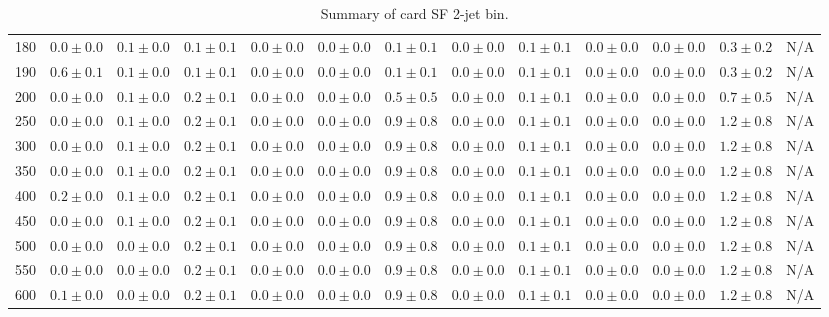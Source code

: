 \begin{table}
{\begin{center}
\begin{tabular}{l | c c | c c c c c c c c  | c c}
180 & $0.0\pm0.0$ & $0.1\pm0.0$ & $0.1\pm0.1$ & $0.0\pm0.0$ & $0.0\pm0.0$ & $0.1\pm0.1$ & $0.0\pm0.0$ & $0.1\pm0.1$ & $0.0\pm0.0$ & $0.0\pm0.0$ & $0.3\pm0.2$ &  N/A \\
190 & $0.6\pm0.1$ & $0.1\pm0.0$ & $0.1\pm0.1$ & $0.0\pm0.0$ & $0.0\pm0.0$ & $0.1\pm0.1$ & $0.0\pm0.0$ & $0.1\pm0.1$ & $0.0\pm0.0$ & $0.0\pm0.0$ & $0.3\pm0.2$ &  N/A \\
200 & $0.0\pm0.0$ & $0.1\pm0.0$ & $0.2\pm0.1$ & $0.0\pm0.0$ & $0.0\pm0.0$ & $0.5\pm0.5$ & $0.0\pm0.0$ & $0.1\pm0.1$ & $0.0\pm0.0$ & $0.0\pm0.0$ & $0.7\pm0.5$ &  N/A \\
250 & $0.0\pm0.0$ & $0.1\pm0.0$ & $0.2\pm0.1$ & $0.0\pm0.0$ & $0.0\pm0.0$ & $0.9\pm0.8$ & $0.0\pm0.0$ & $0.1\pm0.1$ & $0.0\pm0.0$ & $0.0\pm0.0$ & $1.2\pm0.8$ &  N/A \\
300 & $0.0\pm0.0$ & $0.1\pm0.0$ & $0.2\pm0.1$ & $0.0\pm0.0$ & $0.0\pm0.0$ & $0.9\pm0.8$ & $0.0\pm0.0$ & $0.1\pm0.1$ & $0.0\pm0.0$ & $0.0\pm0.0$ & $1.2\pm0.8$ &  N/A \\
350 & $0.0\pm0.0$ & $0.1\pm0.0$ & $0.2\pm0.1$ & $0.0\pm0.0$ & $0.0\pm0.0$ & $0.9\pm0.8$ & $0.0\pm0.0$ & $0.1\pm0.1$ & $0.0\pm0.0$ & $0.0\pm0.0$ & $1.2\pm0.8$ &  N/A \\
400 & $0.2\pm0.0$ & $0.1\pm0.0$ & $0.2\pm0.1$ & $0.0\pm0.0$ & $0.0\pm0.0$ & $0.9\pm0.8$ & $0.0\pm0.0$ & $0.1\pm0.1$ & $0.0\pm0.0$ & $0.0\pm0.0$ & $1.2\pm0.8$ &  N/A \\
450 & $0.0\pm0.0$ & $0.1\pm0.0$ & $0.2\pm0.1$ & $0.0\pm0.0$ & $0.0\pm0.0$ & $0.9\pm0.8$ & $0.0\pm0.0$ & $0.1\pm0.1$ & $0.0\pm0.0$ & $0.0\pm0.0$ & $1.2\pm0.8$ &  N/A \\
500 & $0.0\pm0.0$ & $0.0\pm0.0$ & $0.2\pm0.1$ & $0.0\pm0.0$ & $0.0\pm0.0$ & $0.9\pm0.8$ & $0.0\pm0.0$ & $0.1\pm0.1$ & $0.0\pm0.0$ & $0.0\pm0.0$ & $1.2\pm0.8$ &  N/A \\
550 & $0.0\pm0.0$ & $0.0\pm0.0$ & $0.2\pm0.1$ & $0.0\pm0.0$ & $0.0\pm0.0$ & $0.9\pm0.8$ & $0.0\pm0.0$ & $0.1\pm0.1$ & $0.0\pm0.0$ & $0.0\pm0.0$ & $1.2\pm0.8$ &  N/A \\
600 & $0.1\pm0.0$ & $0.0\pm0.0$ & $0.2\pm0.1$ & $0.0\pm0.0$ & $0.0\pm0.0$ & $0.9\pm0.8$ & $0.0\pm0.0$ & $0.1\pm0.1$ & $0.0\pm0.0$ & $0.0\pm0.0$ & $1.2\pm0.8$ &  N/A \\
\hline
\end{tabular}
\end{center}
}
\caption{Summary of card SF 2-jet bin.}
\end{table}
